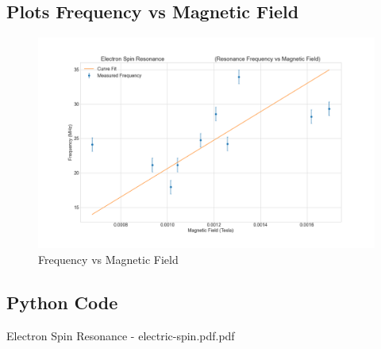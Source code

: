 \documentclass[letterpaper,12pt]{article}
\begin{document}
\subsection{Plots Frequency vs Magnetic Field}
\begin{figure}[H]
  \centering
  \includegraphics[width=0.95\linewidth]{../code/Pankaj/lab6_freq_vs_magnetic_field.png}    
  \begin{center}
    \begin{center}   
    \end{center}  \end{center}
  \caption{Frequency vs Magnetic Field}
  \label{frq-vs-b}
\end{figure}

\pagebreak

\subsection{Python Code}

\pagebreak

\begin{thebibliography}{99}

 Electron Spin Resonance - electric-spin.pdf.pdf

\end{thebibliography}
\end{document}
